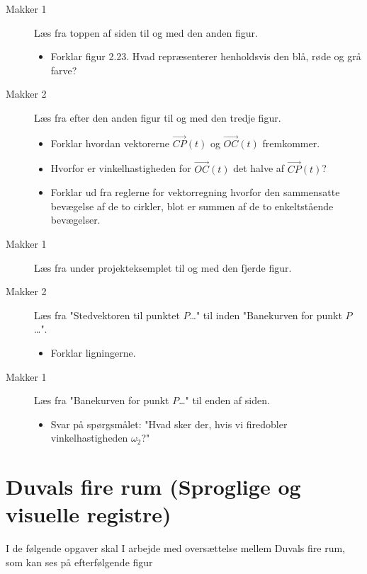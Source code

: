 \documentclass[a4paper, 12pt]{article}
\begin{document}
\begin{description}
\item[{Makker 1}] Læs fra toppen af siden til og med den anden figur.
\begin{itemize}
\item Forklar figur 2.23. Hvad repræsenterer henholdsvis den blå, røde og grå farve?
\end{itemize}

\item[{Makker 2}] Læs fra efter den anden figur til og med den tredje figur.
\begin{itemize}
\item Forklar hvordan vektorerne \(\overrightarrow{CP}(t)\) og \(\overrightarrow{OC}(t)\) fremkommer.
\item Hvorfor er vinkelhastigheden for \(\overrightarrow{OC}(t)\) det halve af \(\overrightarrow{CP}(t)\)?
\item Forklar ud fra reglerne for vektorregning hvorfor den sammensatte bevægelse af de to cirkler, blot er summen af de to enkeltstående bevægelser.
\end{itemize}

\item[{Makker 1}] Læs fra under projekteksemplet til og med den fjerde figur.

\item[{Makker 2}] Læs fra "Stedvektoren til punktet \(P\)\ldots{}" til inden "Banekurven for punkt \(P\)\ldots{}".
\begin{itemize}
\item Forklar ligningerne.
\end{itemize}

\item[{Makker 1}] Læs fra "Banekurven for punkt \(P\)\ldots{}" til enden af siden.
\begin{itemize}
\item Svar på spørgsmålet: "Hvad sker der, hvis vi firedobler vinkelhastigheden \(\omega_2\)?"
\end{itemize}
\end{description}


\section*{Duvals fire rum (Sproglige og visuelle registre)}
\label{sec:org27452c3}

I de følgende opgaver skal I arbejde med oversættelse mellem Duvals fire rum, som kan ses på efterfølgende figur
\end{document}
